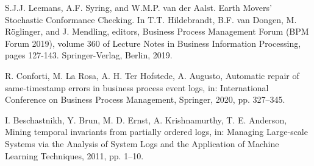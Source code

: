 \begin{thebibliography}
S.J.J. Leemans, A.F. Syring, and W.M.P. van der Aalst. Earth Movers’ Stochastic Conformance Checking. In T.T. Hildebrandt, B.F. van Dongen, M. Röglinger, and J. Mendling, editors, Business Process Management Forum (BPM Forum 2019), volume 360 of Lecture Notes in Business Information Processing, pages 127-143. Springer-Verlag, Berlin, 2019.

R. Conforti, M. La Rosa, A. H. Ter Hofstede, A. Augusto, Automatic repair of same-timestamp errors in business
process event logs, in: International Conference on Business Process Management, Springer, 2020, pp. 327–345.

I. Beschastnikh, Y. Brun, M. D. Ernst, A. Krishnamurthy, T. E. Anderson, Mining temporal invariants from partially ordered logs, in: Managing Large-scale Systems via the Analysis of System Logs and the Application of Machine Learning Techniques, 2011, pp. 1–10.




\end{thebibliography}